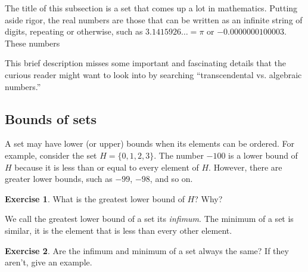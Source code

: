 \documentclass{book}
\theoremstyle{definition}
\newtheorem{exercise}{Exercise}[chapter]
\theoremstyle{colonstylebf}
\newcommand{\set}[1]{\{#1\}}
\begin{document}
The title of this subsection is a set that comes up a lot in mathematics. Putting aside rigor, the real numbers are those that can be written as an infinite string of digits, repeating or otherwise, such as $3.1415926\dots = \pi$ or $-0.0000000100003$. These numbers

This brief description misses some important and fascinating details that the curious reader might want to look into by searching ``transcendental vs. algebraic numbers.''

\subsection{Bounds of sets}
A set may have lower (or upper) bounds when its elements can be ordered. For example, consider the set $H = \set{0, 1, 2, 3}$. The number $-100$ is a lower bound of $H$ because it is less than or equal to every element of $H$. However, there are greater lower bounds, such as $-99$, $-98$, and so on.
\begin{exercise}\label{lowerbound}
What is the greatest lower bound of $H$? Why?
\end{exercise}

We call the greatest lower bound of a set its \textit{infimum}. The minimum of a set is similar, it is the element that is less than every other element. 
\begin{exercise}\label{reallower}
Are the infimum and minimum of a set always the same? If they aren't, give an example.
\end{exercise}
\end{document}
